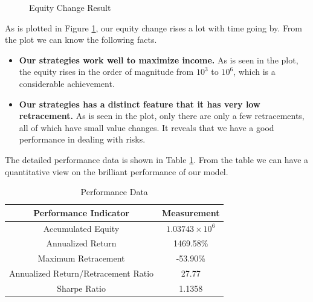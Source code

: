 \documentclass[12pt,a4paper]{article}
\begin{document}
\begin{spacing}{1.2}
\begin{figure}[H]
	\caption{Equity Change Result}
	\label{figure:equity_change}
\end{figure}

As is plotted in Figure \ref{figure:equity_change}, our equity change rises a lot with time going by. From the plot we can know the following facts.

\begin{itemize}
	\item \textbf{Our strategies work well to maximize income.} As is seen in the plot, the equity rises in the order of magnitude from $10^3$ to $10^6$, which is a considerable achievement.
	
	\item \textbf{Our strategies has a distinct feature that it has very low retracement.} As is seen in the plot, only there are only a few retracements, all of which have small value changes. It reveals that we have a good performance in dealing with risks.
\end{itemize}

The detailed performance data is shown in Table \ref{table:performance}. From the table we can have a quantitative view on the brilliant performance of our model.

\begin{table}[H]
	\renewcommand{\arraystretch}{1.5}
	\caption{Performance Data}
	\label{table:performance}
	\begin{center}
		{\footnotesize
			\begin{tabular}{c c }
				\toprule
				Performance Indicator & Measurement\\
				\midrule
				Accumulated Equity & $1.03743 \times 10^6$ \\
				Annualized Return & 1469.58\% \\
				Maximum Retracement & -53.90\% \\
				Annualized Return/Retracement Ratio & 27.77 \\
				Sharpe Ratio & 1.1358 \\
				\bottomrule
		\end{tabular}}
	\end{center}	
\end{table}




\end{spacing}
\end{document}
